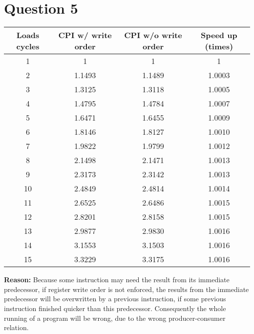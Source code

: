 \documentclass[12pt,letterpaper]{article}
\begin{document}
 \section*{Question 5}
\begin{tabular}{|c|c|c|c|}
\hline 
Loads cycles & CPI w/ write order & CPI w/o write order & Speed up 
(times)\\ 
\hline 
1 & 1 &  1 & 1\\ 
\hline 
2 & 1.1493 & 1.1489 & 1.0003\\ 
\hline 
3 & 1.3125 & 1.3118 & 1.0005\\ 
\hline 
4 & 1.4795 & 1.4784 & 1.0007\\ 
\hline 
5 & 1.6471 & 1.6455 & 1.0009\\ 
\hline 
6 & 1.8146 & 1.8127 & 1.0010\\ 
\hline 
7 & 1.9822 & 1.9799 & 1.0012\\ 
\hline 
8 & 2.1498 & 2.1471 & 1.0013\\ 
\hline 
9 & 2.3173 & 2.3142 & 1.0013\\ 
\hline 
10 & 2.4849 & 2.4814 & 1.0014\\ 
\hline 
11 & 2.6525 & 2.6486 & 1.0015\\ 
\hline 
12 & 2.8201 & 2.8158 & 1.0015\\ 
\hline 
13 & 2.9877 & 2.9830 & 1.0016\\ 
\hline 
14 & 3.1553 & 3.1503 & 1.0016\\ 
\hline 
15 & 3.3229 & 3.3175 & 1.0016\\ 
\hline 
\end{tabular} 

 \textbf{Reason:} Because some instruction may need the result from its
immediate predecessor, if register write order is not enforced, 
 the results from the immediate predecessor will be overwritten by 
a previous instruction, if some previous instruction finished quicker than
this predecessor. Consequently the whole running of a program will 
 be wrong, due to the wrong producer-consumer relation.
  
\end{document}
